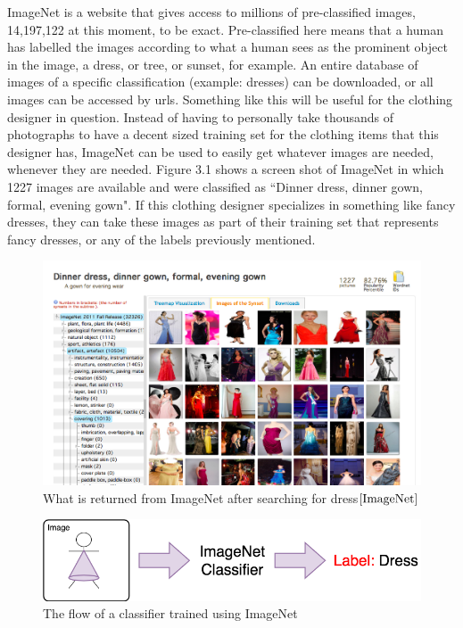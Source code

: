 \documentclass[12pt]{report} %
\begin{document}
	ImageNet \cite{ImageNet} is a website that gives access to millions of pre-classified images, 14,197,122 at this moment, to be exact. Pre-classified here means that a human has labelled the images according to what a human sees as the prominent object in the image, a dress, or tree, or sunset, for example. An entire database of images of a specific classification (example: dresses) can be downloaded, or all images can be accessed by urls. Something like this will be useful for the clothing designer in question. Instead of having to personally take thousands of photographs to have a decent sized training set for the clothing items that this designer has, ImageNet can be used to easily get whatever images are needed, whenever they are needed. Figure 3.1 shows a screen shot of ImageNet in which 1227 images are available and were classified as ``Dinner dress, dinner gown, formal, evening gown". If this clothing designer specializes in something like fancy dresses, they can take these images as part of their training set that represents fancy dresses, or any of the labels previously mentioned.
\begin{figure}
\centering
\includegraphics[width=7in]{Imagenet_dress}
\caption[ImageNet Search]
	{What is returned from ImageNet after searching for dress$\cite{ImageNet}$}
\end{figure}	

\begin{figure}
\centering
\includegraphics[width=7in]{Imagenet_flow}
\caption[Flow Diagram: ImageNet Classifier]
	{The flow of a classifier trained using ImageNet}
\end{figure}	
\end{document}
